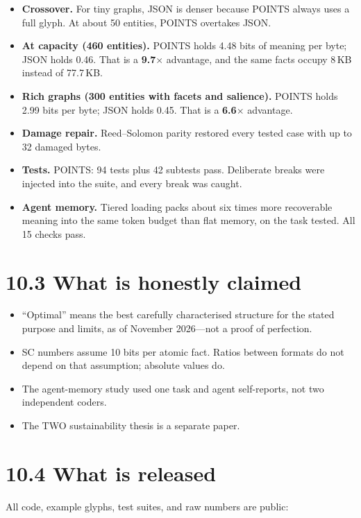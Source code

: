 \begin{itemize}
\item \textbf{Crossover.} For tiny graphs, JSON is denser because POINTS always uses a full glyph. At about 50 entities, POINTS overtakes JSON.
\item \textbf{At capacity (460 entities).} POINTS holds 4.48 bits of meaning per byte; JSON holds 0.46. That is a \textbf{9.7$\times$} advantage, and the same facts occupy 8\,KB instead of 77.7\,KB.
\item \textbf{Rich graphs (300 entities with facets and salience).} POINTS holds 2.99 bits per byte; JSON holds 0.45. That is a \textbf{6.6$\times$} advantage.
\item \textbf{Damage repair.} Reed--Solomon parity restored every tested case with up to 32 damaged bytes.
\item \textbf{Tests.} POINTS: 94 tests plus 42 subtests pass. Deliberate breaks were injected into the suite, and every break was caught.
\item \textbf{Agent memory.} Tiered loading packs about six times more recoverable meaning into the same token budget than flat memory, on the task tested. All 15 checks pass.
\end{itemize}

\section*{10.3 What is honestly claimed}

\begin{itemize}
\item ``Optimal'' means the best carefully characterised structure for the stated purpose and limits, as of November 2026---not a proof of perfection.
\item SC numbers assume 10 bits per atomic fact. Ratios between formats do not depend on that assumption; absolute values do.
\item The agent-memory study used one task and agent self-reports, not two independent coders.
\item The TWO sustainability thesis is a separate paper.
\end{itemize}

\section*{10.4 What is released}

All code, example glyphs, test suites, and raw numbers are public:

